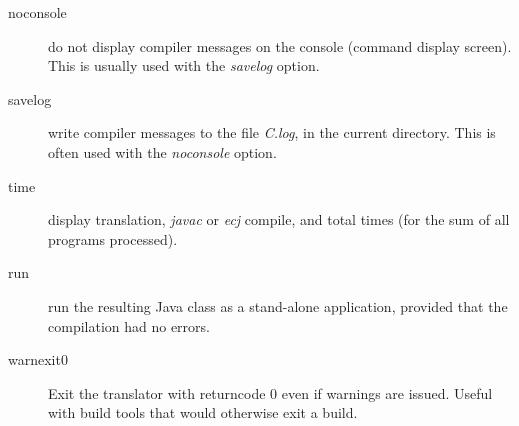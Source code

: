 \begin{description}
\item[noconsole]
do not display compiler messages on the console (command display
screen).  This is usually used with the \emph{savelog} option.
\item[savelog]
write compiler messages to the file \emph{\nr{}C.log}, in the current
directory.
This is often used with the \emph{noconsole} option.
\item[time]
display translation, \emph{javac} or \emph{ecj} compile, and total times (for the sum
of all programs processed).
\item[run]
run the resulting Java class as a stand-alone application, provided that
the compilation had no errors.
\item[warnexit0]
Exit the translator with returncode 0 even if warnings are issued. Useful with build tools that would otherwise exit a build.
\end{description}
